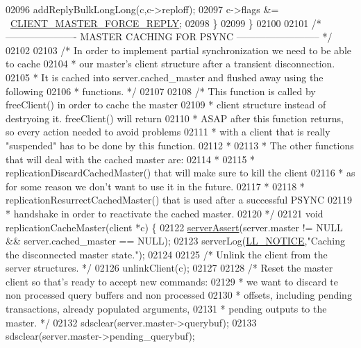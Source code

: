 \begin{DoxyCode}
{{{{{{{{{{{{{{{{{{{{{{{{{{{{{{{{{{{{{{{{{{{{{{{{{{{{{{{{{{{{{{{{{{{{{{{{{02096         addReplyBulkLongLong(c,c->reploff);
02097         c->flags &= ~\hyperlink{server_8h_a291fd012c9b504c52c371e7185f0a57c}{CLIENT\_MASTER\_FORCE\_REPLY};
02098     \}
02099 \}
02100 
02101 \textcolor{comment}{/* ---------------------- MASTER CACHING FOR PSYNC -------------------------- */}
02102 
02103 \textcolor{comment}{/* In order to implement partial synchronization we need to be able to cache}
02104 \textcolor{comment}{ * our master's client structure after a transient disconnection.}
02105 \textcolor{comment}{ * It is cached into server.cached\_master and flushed away using the following}
02106 \textcolor{comment}{ * functions. */}
02107 
02108 \textcolor{comment}{/* This function is called by freeClient() in order to cache the master}
02109 \textcolor{comment}{ * client structure instead of destryoing it. freeClient() will return}
02110 \textcolor{comment}{ * ASAP after this function returns, so every action needed to avoid problems}
02111 \textcolor{comment}{ * with a client that is really "suspended" has to be done by this function.}
02112 \textcolor{comment}{ *}
02113 \textcolor{comment}{ * The other functions that will deal with the cached master are:}
02114 \textcolor{comment}{ *}
02115 \textcolor{comment}{ * replicationDiscardCachedMaster() that will make sure to kill the client}
02116 \textcolor{comment}{ * as for some reason we don't want to use it in the future.}
02117 \textcolor{comment}{ *}
02118 \textcolor{comment}{ * replicationResurrectCachedMaster() that is used after a successful PSYNC}
02119 \textcolor{comment}{ * handshake in order to reactivate the cached master.}
02120 \textcolor{comment}{ */}
02121 \textcolor{keywordtype}{void} replicationCacheMaster(client *c) \{
02122     \hyperlink{server_8h_a88114b5169b4c382df6b56506285e56a}{serverAssert}(server.master != NULL && server.cached\_master == NULL);
02123     serverLog(\hyperlink{server_8h_a8c54c191e436c7dd3012167212692401}{LL\_NOTICE},\textcolor{stringliteral}{"Caching the disconnected master state."});
02124 
02125     \textcolor{comment}{/* Unlink the client from the server structures. */}
02126     unlinkClient(c);
02127 
02128     \textcolor{comment}{/* Reset the master client so that's ready to accept new commands:}
02129 \textcolor{comment}{     * we want to discard te non processed query buffers and non processed}
02130 \textcolor{comment}{     * offsets, including pending transactions, already populated arguments,}
02131 \textcolor{comment}{     * pending outputs to the master. */}
02132     sdsclear(server.master->querybuf);
02133     sdsclear(server.master->pending\_querybuf);
}}}}}}}}}}}}}}}}}}}}}}}}}}}}}}}}}}}}}}}}}}}}}}}}}}}}}}}}}}}}}}}}}}}}}}}}}
\end{DoxyCode}
